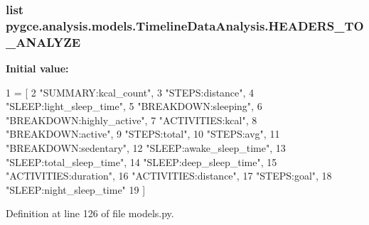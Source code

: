 \subsubsection[{\texorpdfstring{H\+E\+A\+D\+E\+R\+S\+\_\+\+T\+O\+\_\+\+A\+N\+A\+L\+Y\+ZE}{HEADERS_TO_ANALYZE}}]{\setlength{\rightskip}{0pt plus 5cm}list pygce.\+analysis.\+models.\+Timeline\+Data\+Analysis.\+H\+E\+A\+D\+E\+R\+S\+\_\+\+T\+O\+\_\+\+A\+N\+A\+L\+Y\+ZE\hspace{0.3cm}{\ttfamily [static]}}\hypertarget{classpygce_1_1analysis_1_1models_1_1_timeline_data_analysis_abc835b2b9b9d8555a2b49e8534782021}{}\label{classpygce_1_1analysis_1_1models_1_1_timeline_data_analysis_abc835b2b9b9d8555a2b49e8534782021}
{\bfseries Initial value\+:}
\begin{DoxyCode}
1 = [
2         \textcolor{stringliteral}{"SUMMARY:kcal\_count"},
3         \textcolor{stringliteral}{"STEPS:distance"},
4         \textcolor{stringliteral}{"SLEEP:light\_sleep\_time"},
5         \textcolor{stringliteral}{"BREAKDOWN:sleeping"},
6         \textcolor{stringliteral}{"BREAKDOWN:highly\_active"},
7         \textcolor{stringliteral}{"ACTIVITIES:kcal"},
8         \textcolor{stringliteral}{"BREAKDOWN:active"},
9         \textcolor{stringliteral}{"STEPS:total"},
10         \textcolor{stringliteral}{"STEPS:avg"},
11         \textcolor{stringliteral}{"BREAKDOWN:sedentary"},
12         \textcolor{stringliteral}{"SLEEP:awake\_sleep\_time"},
13         \textcolor{stringliteral}{"SLEEP:total\_sleep\_time"},
14         \textcolor{stringliteral}{"SLEEP:deep\_sleep\_time"},
15         \textcolor{stringliteral}{"ACTIVITIES:duration"},
16         \textcolor{stringliteral}{"ACTIVITIES:distance"},
17         \textcolor{stringliteral}{"STEPS:goal"},
18         \textcolor{stringliteral}{"SLEEP:night\_sleep\_time"}
19     ]
\end{DoxyCode}


Definition at line 126 of file models.\+py.

